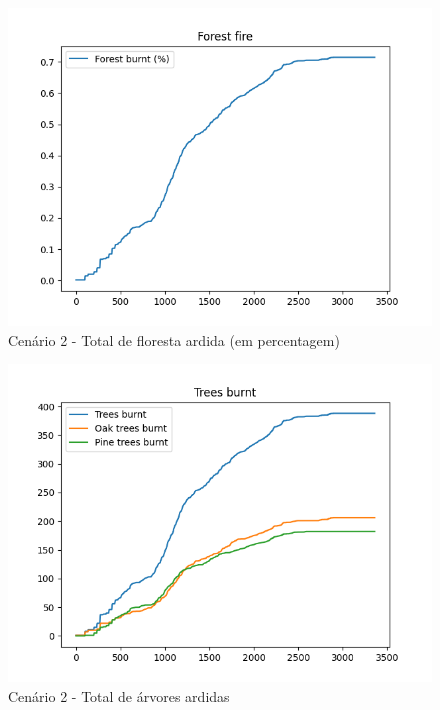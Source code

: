\begin{figure}[H]
    \centering
    \includegraphics[width=\textwidth]{../src/runs/scenario2/forest_fire}
    \caption{Cenário 2 - Total de floresta ardida (em percentagem)}
    \label{fig:S2ForestBurnt}
\end{figure}

\begin{figure}[H]
    \centering
    \includegraphics[width=\textwidth]{../src/runs/scenario2/trees_burnt}
    \caption{Cenário 2 - Total de árvores ardidas}
    \label{fig:S2TreesBurnt}
\end{figure}

